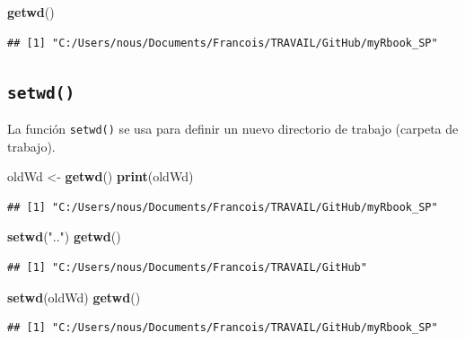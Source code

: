 \documentclass[]{book}
\newenvironment{Shaded}{\begin{snugshade}}{\end{snugshade}}
\newcommand{\KeywordTok}[1]{\textcolor[rgb]{0.13,0.29,0.53}{\textbf{#1}}}
\newcommand{\StringTok}[1]{\textcolor[rgb]{0.31,0.60,0.02}{#1}}
\newcommand{\NormalTok}[1]{#1}
\begin{document}
\begin{Shaded}
\begin{Highlighting}[]
\KeywordTok{getwd}\NormalTok{()}
\end{Highlighting}
\end{Shaded}

\begin{verbatim}
## [1] "C:/Users/nous/Documents/Francois/TRAVAIL/GitHub/myRbook_SP"
\end{verbatim}

\subsection{\texorpdfstring{\texttt{setwd()}}{setwd()}}\label{l015setwd}

La función \texttt{setwd()} se usa para definir un nuevo directorio de
trabajo (carpeta de trabajo).

\begin{Shaded}
\begin{Highlighting}[]
\NormalTok{oldWd <-}\StringTok{ }\KeywordTok{getwd}\NormalTok{()}
\KeywordTok{print}\NormalTok{(oldWd)}
\end{Highlighting}
\end{Shaded}

\begin{verbatim}
## [1] "C:/Users/nous/Documents/Francois/TRAVAIL/GitHub/myRbook_SP"
\end{verbatim}

\begin{Shaded}
\begin{Highlighting}[]
\KeywordTok{setwd}\NormalTok{(}\StringTok{".."}\NormalTok{)}
\KeywordTok{getwd}\NormalTok{()}
\end{Highlighting}
\end{Shaded}

\begin{verbatim}
## [1] "C:/Users/nous/Documents/Francois/TRAVAIL/GitHub"
\end{verbatim}

\begin{Shaded}
\begin{Highlighting}[]
\KeywordTok{setwd}\NormalTok{(oldWd)}
\KeywordTok{getwd}\NormalTok{()}
\end{Highlighting}
\end{Shaded}

\begin{verbatim}
## [1] "C:/Users/nous/Documents/Francois/TRAVAIL/GitHub/myRbook_SP"
\end{verbatim}
\end{document}
